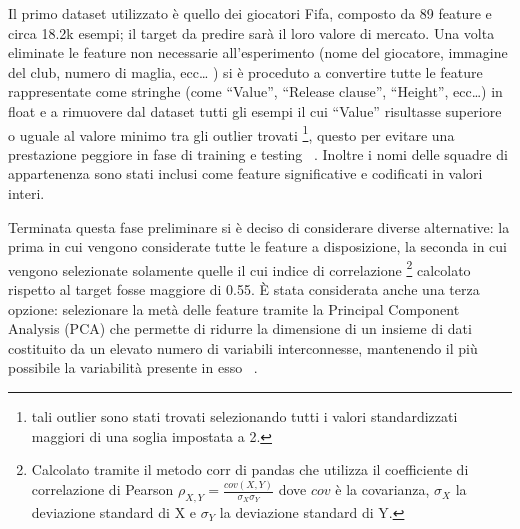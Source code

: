 \documentclass[12pt]{report}
\begin{document}
Il primo dataset utilizzato è quello dei giocatori Fifa, composto da 89 feature e circa 18.2k esempi; il target da predire sarà il loro valore di mercato.
Una volta eliminate le feature non necessarie all’esperimento (nome del giocatore, immagine del club, numero di maglia, ecc… ) si è proceduto a convertire tutte le feature rappresentate come stringhe (come ``Value'', ``Release clause'', ``Height'', ecc…) in float e a rimuovere dal dataset tutti gli esempi il cui ``Value'' risultasse superiore o uguale al valore minimo tra gli outlier trovati \footnote{tali outlier sono stati trovati selezionando tutti i valori standardizzati maggiori di una soglia impostata a 2.}, questo per evitare una prestazione peggiore in fase di training e testing ~\cite{Outlier}. Inoltre i nomi delle squadre di appartenenza sono stati inclusi come feature significative e codificati in valori interi.

Terminata questa fase preliminare si è deciso di considerare diverse alternative: la prima in cui vengono considerate tutte le feature a disposizione, la seconda in cui vengono selezionate solamente quelle il cui indice di correlazione \footnote{Calcolato tramite il metodo corr di pandas che utilizza il coefficiente di correlazione di Pearson $\rho_{X,Y} = \frac{cov(X, Y)}{\sigma_X\sigma_Y}$ dove $cov$ è la covarianza, $\sigma_X$ la deviazione standard di X e $\sigma_Y$ la deviazione standard di Y.} calcolato rispetto al target fosse maggiore di 0.55.
È stata considerata anche una terza opzione: selezionare la metà delle feature tramite la Principal Component Analysis (PCA) che permette di ridurre la dimensione di un insieme di dati costituito da un elevato numero di variabili interconnesse, mantenendo il più possibile la variabilità presente in esso ~\cite{PCA}. 
\end{document}
